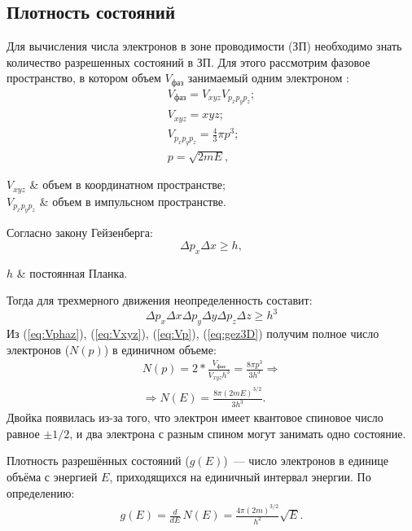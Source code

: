 \subsection{Плотность состояний}
Для вычисления числа электронов в зоне проводимости (ЗП) необходимо знать количество разрешенных состояний в ЗП. Для этого рассмотрим фазовое пространство, в котором объем $V_{\text{фаз}}$ занимаемый одним электроном \cite{Shinkarenko}:
\begin{gather}
	\label{eq:Vphaz}
 	V_{\text{фаз}} = V_{xyz}V_{p_{x}p_{y}p_{z}};\\
	\label{eq:Vxyz}
 	V_{xyz} = xyz;\\
 	\label{eq:Vp}
 	V_{p_{x}p_{y}p_{z}} = \frac{4}{3}\pi p^{3};\\
 	\label{eq:p}
 	p = \sqrt{2mE},
\end{gather} 
\begin{conditions}
	$V_{xyz}$ & объем в координатном пространстве;\\
	$V_{p_{x}p_{y}p_{z}}$ & объем в импульсном пространстве. 
\end{conditions}
Согласно закону Гейзенберга:
\begin{equation}
	\label{eq:gez}
	\Delta p_{x} \Delta x \geq h,
\end{equation}
\begin{conditions}
	$h$ & постоянная Планка.
\end{conditions}
Тогда для трехмерного движения неопределенность составит:
\begin{equation}
	\label{eq:gez3D}
	\Delta p_{x} \Delta x \Delta p_{y} \Delta y\Delta p_{z} \Delta z\geq h^{3}
\end{equation}
Из (\ref{eq:Vphaz}), (\ref{eq:Vxyz}), (\ref{eq:Vp}), (\ref{eq:gez3D}) получим полное число электронов ($N(p)$) в единичном объеме:
\begin{gather}
	N(p) = 2* \frac{V_{\text{фаз}}}{V_{xyz}h^{3}} = \frac{8\pi p^{3}}{3h^{3}} \Rightarrow \\
	\Rightarrow N(E) =  \frac{8\pi (2mE)^{3/2}}{3h^{3}}.
\end{gather}
Двойка появилась из-за того, что электрон имеет квантовое спиновое число равное $\pm 1/2$, и два электрона с разным спином могут занимать одно состояние.

Плотность разрешённых состояний ($g(E)$)~--- число электронов в единице объёма с энергией $E$, приходящихся на единичный интервал энергии. По определению:
\begin{gather}
	g(E) = \frac{d}{dE}\,N(E) = \frac{4\pi (2m)^{3/2}}{h^{2}}\sqrt{E}.
\end{gather}


